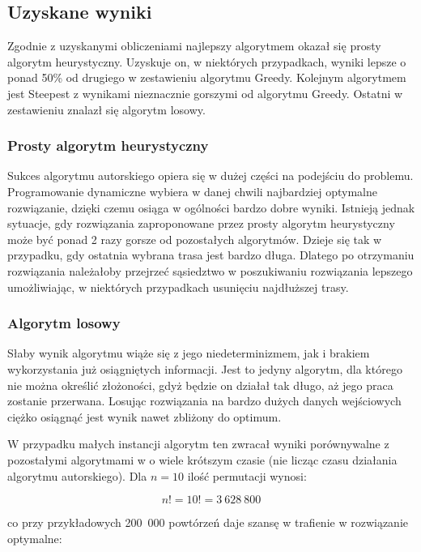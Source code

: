 \subsection{Uzyskane wyniki}
                                                                       
Zgodnie z uzyskanymi obliczeniami najlepszy algorytmem okazał się prosty algorytm 
heurystyczny. Uzyskuje on, w niektórych przypadkach, wyniki lepsze o ponad 50\% od
drugiego w zestawieniu algorytmu Greedy. Kolejnym algorytmem jest Steepest z wynikami 
nieznacznie gorszymi od algorytmu Greedy. Ostatni w zestawieniu znalazł się algorytm 
losowy.

\subsubsection{Prosty algorytm heurystyczny}

Sukces algorytmu autorskiego opiera się w dużej części na podejściu do problemu. 
Programowanie dynamiczne wybiera w danej chwili najbardziej optymalne rozwiązanie, 
dzięki czemu osiąga w ogólności bardzo dobre wyniki. Istnieją jednak sytuacje, gdy 
rozwiązania zaproponowane przez prosty algorytm heurystyczny może być ponad 2 razy 
gorsze od pozostałych algorytmów. Dzieje się tak w przypadku, gdy ostatnia wybrana 
trasa jest bardzo długa. Dlatego po otrzymaniu rozwiązania należałoby przejrzeć 
sąsiedztwo w poszukiwaniu rozwiązania lepszego umożliwiając, w niektórych przypadkach
usunięciu najdłuższej trasy.

\subsubsection{Algorytm losowy}

Słaby wynik algorytmu wiąże się z jego niedeterminizmem, jak i brakiem wykorzystania 
już osiągniętych informacji. Jest to jedyny algorytm, dla którego nie można określić 
złożoności, gdyż będzie on działał tak długo, aż jego praca zostanie przerwana. Losując 
rozwiązania na bardzo dużych danych wejściowych ciężko osiągnąć jest wynik nawet zbliżony 
do optimum. 

W przypadku małych instancji algorytm ten zwracał wyniki porównywalne z 
pozostałymi algorytmami w o wiele krótszym czasie (nie licząc czasu działania algorytmu
autorskiego). Dla $ n = 10 $ ilość permutacji wynosi:

$$ n! = 10! = 3~628~800 $$

co przy przykładowych 200~000 powtórzeń daje szansę w trafienie w rozwiązanie optymalne:

